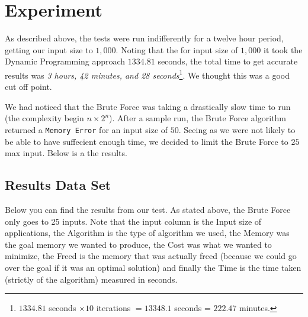 \documentclass{article}
\begin{document}
\section{Experiment}
As described above, the tests were run indifferently for a twelve hour period, getting our input size to $1,000$. Noting that the for input size of $1,000$ it took the Dynamic Programming approach $1334.81$ seconds, the total time to get accurate results was \textit{3 hours, 42 minutes, and 28 seconds}\footnote{$1334.81$ seconds $\times 10$ iterations $= 13348.1$ seconds = $222.47$ minutes.}. We thought this was a good cut off point.

We had noticed that the Brute Force was taking a drastically slow time to run (the complexity begin $n \times 2^n$). After a sample run, the Brute Force algorithm returned a \texttt{Memory Error} for an input size of $50$. Seeing as we were not likely to be able to have suffecient enough time, we decided to limit the Brute Force to $25$ max input. Below is a the results.


\subsection{Results Data Set}
Below you can find the results from our test. As stated above, the Brute Force only goes to 25 inputs. Note that the input column is the Input size of applications, the Algorithm is the type of algorithm we used, the Memory was the goal memory we wanted to produce, the Cost was what we wanted to minimize, the Freed is the memory that was actually freed (because we could go over the goal if it was an optimal solution) and finally the Time is the time taken (strictly of the algorithm) measured in seconds.
\end{document}

